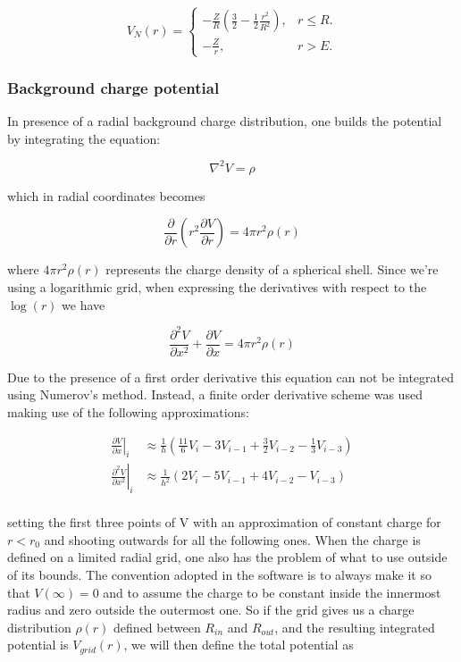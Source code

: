 \documentclass[]{report}
\begin{document}
\begin{equation}
V_N(r) = \begin{cases}
-\frac{Z}{R}\left(\frac{3}{2}-\frac{1}{2}\frac{r^2}{R^2}\right), & \text{$r\leq R$}.\\
-\frac{Z}{r}, & \text{$r > E$}.
\end{cases}
\end{equation}

\subsubsection{Background charge potential}
In presence of a radial background charge distribution, one builds the potential by integrating the equation:

\begin{equation}
\nabla^2 V = \rho
\end{equation}

which in radial coordinates becomes

\begin{equation}
	\frac{\partial}{\partial r}\left(r^2	\frac{\partial V}{\partial r}\right) = 4\pi r^2 \rho(r)
\end{equation}

where $4\pi r^2 \rho(r)$ represents the charge density of a spherical shell. Since we're using a logarithmic grid, when expressing the derivatives with respect to the $\log(r)$ we have

\begin{equation}
\frac{\partial^2 V}{\partial x^2} + \frac{\partial V}{\partial x}= 4\pi r^2 \rho(r)
\end{equation}

Due to the presence of a first order derivative this equation can not be integrated using Numerov's method. Instead, a finite order derivative scheme was used making use of the following approximations:

\begin{align}
\left.\frac{\partial V}{\partial x}\right|_i &\approx \frac{1}{h}\left(\frac{11}{6}V_i -3V_{i-1} +\frac{3}{2}V_{i-2}-\frac{1}{3}V_{i-3} \right) \\
\left.\frac{\partial^2 V}{\partial x^2}\right|_i &\approx \frac{1}{h^2}\left(2V_i -5V_{i-1} +4V_{i-2}-V_{i-3} \right) \\
\end{align}

setting the first three points of V with an approximation of constant charge for $r < r_0$ and shooting outwards for all the following ones.\newline 
When the charge is defined on a limited radial grid, one also has the problem of what to use outside of its bounds. The convention adopted in the software is to always make it so that $V(\infty) = 0$ and to assume the charge to be constant inside the innermost radius and zero outside the outermost one. So if the grid gives us a charge distribution $\rho(r)$ defined between $R_{in}$ and $R_{out}$, and the resulting integrated potential is $V_{grid}(r)$, we will then define the total potential as
\end{document}
